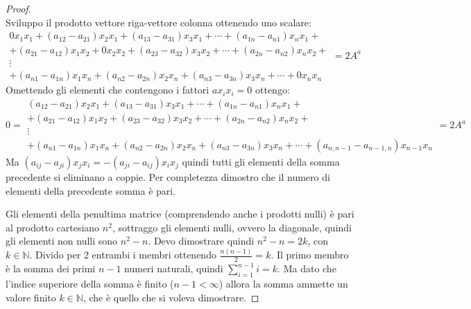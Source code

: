 \begin{proof}
\begin{displaymath}
\end{displaymath}
Sviluppo il prodotto vettore riga-vettore colonna ottenendo uno scalare:
\begin{displaymath}
\begin{array}{c}
0x_{1}x_{1} + (a_{12} - a_{21})x_{2}x_{1} + (a_{13} - a_{31})x_{3}x_{1} + \cdots
+ (a_{1n} - a_{n1})x_{n}x_{1} +\\ 
+ (a_{21} - a_{12})x_{1}x_{2} + 0x_{2}x_{2} + (a_{23} - a_{32})x_{3}x_{2} +
\cdots + (a_{2n} - a_{n2})x_{n}x_{2} + \\ 
\vdots\\
+ (a_{n1} - a_{1n})x_{1}x_{n} + (a_{n2} - a_{2n})x_{2}x_{n} + (a_{n3} -
a_{3n})x_{3}x_{n} + \cdots + 0x_{n}x_{n}
\end{array} = 2 A^{a}
\end{displaymath}
Omettendo gli elementi che contengono i fattori $a x_{i} x_{i} = 0$ ottengo:
\begin{displaymath}
0 = \begin{array}{c}
(a_{12} - a_{21})x_{2}x_{1} + (a_{13} - a_{31})x_{3}x_{1} + \cdots
+ (a_{1n} - a_{n1})x_{n}x_{1} +\\ 
+ (a_{21} - a_{12})x_{1}x_{2} + (a_{23} - a_{32})x_{3}x_{2} +
\cdots + (a_{2n} - a_{n2})x_{n}x_{2} + \\ 
\vdots\\
+ (a_{n1} - a_{1n})x_{1}x_{n} + (a_{n2} - a_{2n})x_{2}x_{n} + (a_{n3} -
a_{3n})x_{3}x_{n} + \cdots + (a_{n,n-1} - a_{n-1,n})x_{n-1}x_{n} 
\end{array} = 2 A^{a}
\end{displaymath}
Ma $(a_{ij} - a_{ji})x_{j}x_{i} = -(a_{ji}-a_{ij})x_{i}x_{j}$ quindi tutti gli
elementi della somma precedente si eliminano a coppie. Per completezza dimostro
che il numero di elementi della precedente somma \`e pari. 

Gli elementi della penultima matrice (comprendendo anche i prodotti nulli) \`e
pari al prodotto cartesiano $n^{2}$, sottraggo gli elementi nulli, ovvero la
diagonale, quindi gli elementi non nulli sono $n^{2} - n$. Devo dimostrare
quindi $n^{2} - n = 2k$, con $k \in \mathbb{N}$. Divido per 2 entrambi i membri
ottenendo $\frac{n(n - 1)}{2} = k$. Il primo membro \`e la somma dei primi $n-1$
numeri naturali, quindi $\sum_{i=1}^{n-1}{i} = k$. Ma dato che l'indice
superiore della somma \`e finito ($n-1 <\infty$) allora la somma ammette un
valore finito $k \in \mathbb{N}$, che \`e quello che si voleva dimostrare.
\end{proof}

